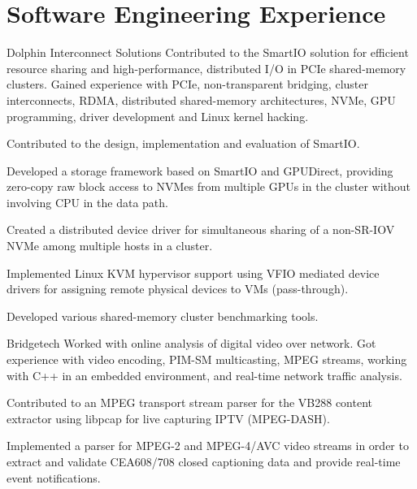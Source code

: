 \section{Software Engineering Experience}
\begin{experience}{Dolphin Interconnect Solutions}{
}
Contributed to the SmartIO solution for efficient resource sharing and high-performance, distributed I/O 
in PCIe shared-memory clusters. 
Gained experience with PCIe, non-transparent bridging, cluster interconnects, RDMA, distributed shared-memory
architectures, NVMe, GPU programming, driver development and Linux kernel hacking.
\begin{contribs}
	\item{Contributed to the design, implementation and evaluation of SmartIO.}
	\item{Developed a storage framework based on SmartIO and GPUDirect, providing
		zero-copy raw block access to NVMes from multiple GPUs in the cluster without involving CPU in the data path.}
	\item{Created a distributed device driver for simultaneous sharing of a non-SR-IOV NVMe among multiple hosts in a cluster.}
	\item{Implemented Linux KVM hypervisor support using VFIO mediated device drivers
		for assigning remote physical devices to VMs (pass-through).}
	\item{Developed various shared-memory cluster benchmarking tools.}
\end{contribs}
\end{experience}

\begin{experience}{Bridgetech}{
}
Worked with online analysis of digital video over network.
Got experience with video encoding, PIM-SM multicasting, MPEG 
streams, working with C++ in an embedded environment, and
real-time network traffic analysis.

\begin{contribs}
	\item{Contributed to an MPEG transport stream parser for the VB288 content extractor using libpcap for live capturing
		IPTV (MPEG-DASH).}
	\item{Implemented a parser for MPEG-2 and MPEG-4/AVC video streams in order to extract and
		validate CEA608/708 closed captioning data and provide real-time event
		notifications.}
\end{contribs}
\end{experience}

